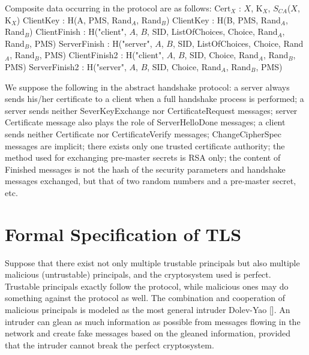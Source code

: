 \documentclass[a4paper,fleqn]{cas-dc}
\begin{document}
Composite data occurring in the protocol are as follows:
Cert$_X$ : $X$, K$_X$, $S_{CA}$($X$, K$_X$) \newline
ClientKey : H(A, PMS, Rand$_A$, Rand$_B$) \newline
ClientKey : H(B, PMS, Rand$_A$, Rand$_B$) \newline
ClientFinish : H("client", $A$, $B$, SID, ListOfChoices, Choice, Rand$_A$, Rand$_B$, PMS)\newline
ServerFinish : H("server", $A$, $B$, SID, ListOfChoices, Choice, Rand$_A$, Rand$_B$, PMS)\newline
ClientFinish2 : H("client", $A$, $B$, SID, Choice, Rand$_A$, Rand$_B$, PMS)\newline
ServerFinish2 : H("server", $A$, $B$, SID, Choice, Rand$_A$, Rand$_B$, PMS)\newline

We suppose the following in the abstract handshake protocol: a server always sends his/her certificate to a client when a full handshake process is performed; a server sends neither SeverKeyExchange nor CertificateRequest messages; server Certificate message also plays the role of ServerHelloDone messages; a client sends neither Certificate nor CertificateVerify messages; ChangeCipherSpec messages are implicit; there exists only one trusted certificate authority; the method used for exchanging pre-master secrets is RSA only; the content of Finished messages is not the hash of the security parameters and handshake messages exchanged, but that of two random numbers and a pre-master secret, etc.

\section{Formal Specification of TLS} \label{fstls}
Suppose that there exist not only multiple trustable
principals but also multiple malicious (untrustable) principals, and the cryptosystem used is perfect. Trustable
principals exactly follow the protocol, while malicious ones may do something against the protocol as well. The combination and cooperation of malicious principals is modeled as the most general intruder Dolev-Yao [\cite{dolev}]. 
An intruder can glean as much information as possible from messages flowing in the network and create fake messages based on the gleaned information, provided that the intruder cannot break the perfect cryptosystem.
\end{document}
